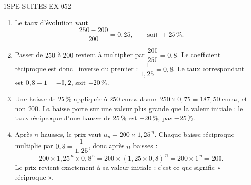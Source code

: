 \begin{corrige}{1SPE-SUITES-EX-052}
\begin{enumerate}
\item Le taux d'évolution vaut
  \[
    \frac{250 - 200}{200} = 0{,}25, \qquad\text{soit } +25\,\%.
  \]

\item Passer de $250$ à $200$ revient à multiplier par
  $\dfrac{200}{250} = 0{,}8$. Le coefficient réciproque est donc l'inverse du
  premier : $\dfrac{1}{1{,}25} = 0{,}8$. Le taux correspondant est
  $0{,}8 - 1 = -0{,}2$, soit $-20\,\%$.

\item Une baisse de $25\,\%$ appliquée à $250$ euros donne
  $250 \times 0{,}75 = 187{,}50$ euros, et non $200$. La baisse porte sur une
  valeur plus grande que la valeur initiale : le taux réciproque d'une hausse
  de $25\,\%$ est $-20\,\%$, pas $-25\,\%$.

\item Après $n$ hausses, le prix vaut $u_n = 200 \times 1{,}25^{\,n}$. Chaque
  baisse réciproque multiplie par $0{,}8 = \dfrac{1}{1{,}25}$, donc après $n$
  baisses :
  \[
    200 \times 1{,}25^{\,n} \times 0{,}8^{\,n}
    = 200 \times (1{,}25 \times 0{,}8)^{\,n}
    = 200 \times 1^{\,n} = 200.
  \]
  Le prix revient exactement à sa valeur initiale : c'est ce que signifie
  « réciproque ».
\end{enumerate}
\end{corrige}
